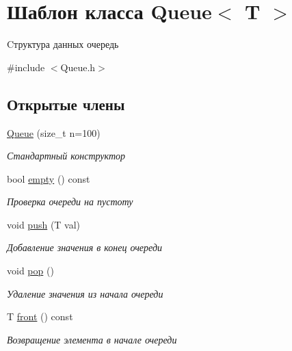 \hypertarget{classQueue}{}\section{Шаблон класса Queue$<$ T $>$}
\label{classQueue}


Cтруктура данных очередь  




{\ttfamily \#include $<$Queue.\+h$>$}

\subsection*{Открытые члены}
\begin{DoxyCompactItemize}
\item 
\mbox{\label{classQueue_ab25281eb5ba9f6e512e96201598f46b2}} 
\hyperlink{classQueue_ab25281eb5ba9f6e512e96201598f46b2}{Queue} (size\+\_\+t n=100)
\begin{DoxyCompactList}\small\item\em Стандартный конструктор \end{DoxyCompactList}\item 
bool \hyperlink{classQueue_a84af2287bc5dad708508b588dc73457d}{empty} () const
\begin{DoxyCompactList}\small\item\em Проверка очереди на пустоту \end{DoxyCompactList}\item 
void \hyperlink{classQueue_a296728a60552a6676313379be7e0bc8a}{push} (T val)
\begin{DoxyCompactList}\small\item\em Добавление значения в конец очереди \end{DoxyCompactList}\item 
void \hyperlink{classQueue_a02ea784625fe33b5793d00c3b02b4878}{pop} ()
\begin{DoxyCompactList}\small\item\em Удаление значения из начала очереди \end{DoxyCompactList}\item 
T \hyperlink{classQueue_a8554e7c5797d5a73fc2c4854a2d57b99}{front} () const
\begin{DoxyCompactList}\small\item\em Возвращение элемента в начале очереди \end{DoxyCompactList}\end{DoxyCompactItemize}


